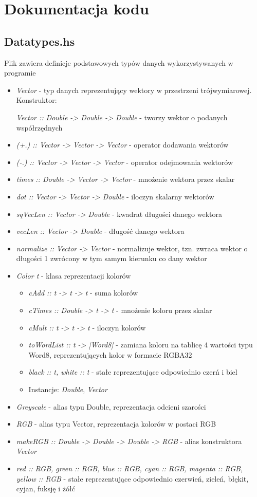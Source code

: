 \documentclass[11pt,a4paper]{article}
\begin{document}
\section{Dokumentacja kodu}
\subsection{Datatypes.hs}
Plik zawiera definicje podstawowych typów danych wykorzystywanych w programie
\begin{itemize}
\item\textit{Vector} - typ danych reprezentujący wektory w przestrzeni trójwymiarowej.\\Konstruktor:
\begin{itemize}
\textit{Vector :: Double -> Double -> Double} - tworzy wektor o podanych współrzędnych
\end{itemize}
\item\textit{(+.) :: Vector -> Vector -> Vector} - operator dodawania wektorów
\item\textit{(-.) :: Vector -> Vector -> Vector} - operator odejmowania wektorów
\item\textit{times :: Double -> Vector -> Vector} - mnożenie wektora przez skalar
\item\textit{dot :: Vector -> Vector -> Double} - iloczyn skalarny wektorów
\item\textit{sqVecLen :: Vector -> Double} - kwadrat długości danego wektora
\item\textit{vecLen :: Vector -> Double} - długość danego wektora
\item\textit{normalize :: Vector -> Vector} - normalizuje wektor, tzn. zwraca wektor o długości 1 zwrócony w tym samym kierunku co dany wektor
\item\textit{Color t} - klasa reprezentacji kolorów
\begin{itemize}
\item\textit{cAdd :: t -> t -> t} - suma kolorów
\item\textit{cTimes :: Double -> t -> t} - mnożenie koloru przez skalar
\item\textit{cMult :: t -> t -> t} - iloczyn kolorów
\item\textit{toWordList :: t -> [Word8]} - zamiana koloru na tablicę 4 wartości typu Word8, reprezentujących kolor w formacie RGBA32
\item\textit{black :: t, white :: t} - stałe reprezentujące odpowiednio czerń i biel
\item Instancje: \textit{Double}, \textit{Vector}
\end{itemize}
\item\textit{Greyscale} - alias typu Double, reprezentacja odcieni szarości
\item\textit{RGB} - alias typu Vector, reprezentacja kolorów w postaci RGB
\item\textit{makeRGB :: Double -> Double -> Double -> RGB} - alias konstruktora \textit{Vector}
\item\textit{red :: RGB, green :: RGB, blue :: RGB, cyan :: RGB, magenta :: RGB, yellow :: RGB} - stałe reprezentujące odpowiednio czerwień, zieleń,  błękit, cyjan, fuksję i żółć
\end{itemize}
\end{document}
